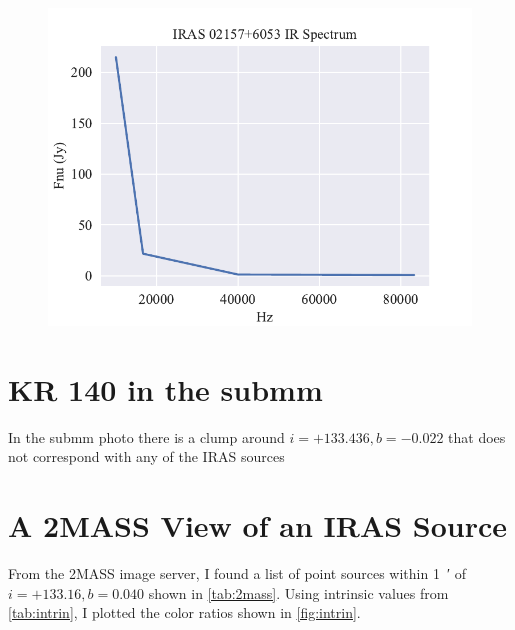 \documentclass[]{article}
\begin{document}
\begin{figure}[H]
	\centering
	\includegraphics[]{figs/spectrum.pdf}
\end{figure}


\section{KR 140 in the submm}

In the submm photo there is a clump around $i=+133.436, b=-0.022$ that does not correspond with any of the IRAS sources

\section{A 2MASS View of an IRAS Source}

From the 2MASS image server, I found a list of point sources within \SI{1}{\arcminute} of $i=+133.16, b=0.040$ shown in \autoref{tab:2mass}. Using intrinsic values from \autoref{tab:intrin}, I plotted the color ratios shown in \autoref{fig:intrin}.
\begin{table}[H]
	\centering
	\label{tab:2mass}
\end{table}

\begin{table}[H]
	\centering
	\label{tab:intrin}
\end{table}
\end{document}
